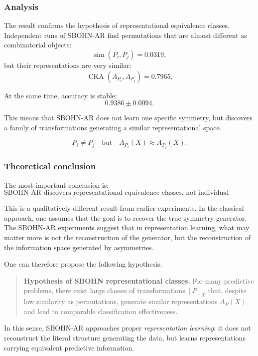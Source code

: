 \documentclass[11pt,a4paper]{report}
\begin{document}
\subsubsection{Analysis}

The result confirms the hypothesis of representational equivalence classes. Independent runs of SBOHN-AR find permutations that are almost different as combinatorial objects:
\[
\operatorname{sim}(P_i,P_j)=0.0319,
\]
but their representations are very similar:
\[
\operatorname{CKA}(A_{P_i},A_{P_j})=0.7965.
\]

At the same time, accuracy is stable:
\[
0.9386\pm0.0094.
\]

This means that SBOHN-AR does not learn one specific symmetry, but discovers a family of transformations generating a similar representational space.

\[
\boxed{
P_i\neq P_j
\quad\text{but}\quad
A_{P_i}(X)\approx A_{P_j}(X).
}
\]

\subsubsection{Theoretical conclusion}

The most important conclusion is:
\[
\boxed{\text{SBOHN-AR discovers representational equivalence classes, not individual generators.}}
\]

This is a qualitatively different result from earlier experiments. In the classical approach, one assumes that the goal is to recover the true symmetry generator. The SBOHN-AR experiments suggest that in representation learning, what may matter more is not the reconstruction of the generator, but the reconstruction of the information space generated by asymmetries.

One can therefore propose the following hypothesis:

\begin{quote}
\textbf{Hypothesis of SBOHN representational classes.}
For many predictive problems, there exist large classes of transformations $[P]_X$ that, despite low similarity as permutations, generate similar representations $A_P(X)$ and lead to comparable classification effectiveness.
\end{quote}

In this sense, SBOHN-AR approaches proper \emph{representation learning}: it does not reconstruct the literal structure generating the data, but learns representations carrying equivalent predictive information.

\end{document}
